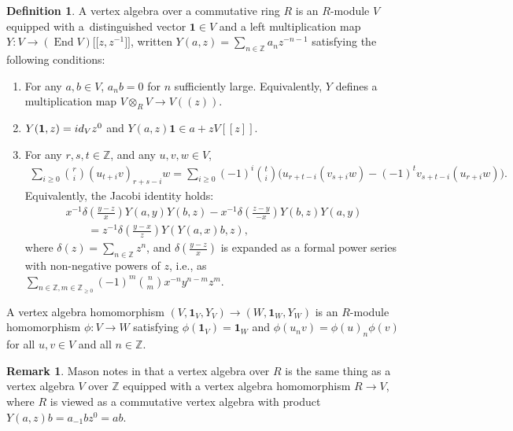 \documentclass[11pt]{article}
\newcommand{\bZ}{\mathbb{Z}}
\newcommand{\unit}{\mathbf{1}}
\DeclareMathOperator{\End}{End}
\theoremstyle{definition}
\newtheorem{defn}[thm]{Definition}
\newtheorem{rem}[thm]{Remark}
\begin{document}
\begin{defn}
A vertex algebra over a commutative ring $R$ is an $R$-module $V$ equipped with a~distinguished vector $\unit \in V$ and a left multiplication map $Y\colon V \to (\End V)\big[\big[z,z^{-1}\big]\big]$, written $Y(a,z) = \sum\limits_{n \in \bZ} a_n z^{-n-1}$ satisfying the following conditions:
\begin{enumerate}\itemsep=0pt
\item For any $a,b \in V$, $a_n b = 0$ for $n$ sufficiently large. Equivalently, $Y$ defines a multiplication map $V \otimes_{R} V \to V((z))$.
\item $Y(\unit,z) = {\rm id}_V z^0$ and $Y(a,z)\unit \in a + zV[[z]]$.
\item For any $r,s,t \in \bZ$, and any $u,v,w \in V$,
\begin{gather*} \sum_{i \geq 0} \binom{r}{i} (u_{t+i} v)_{r+s-i} w = \sum_{i \geq 0} (-1)^i \binom{t}{i} \big(u_{r+t-i}(v_{s+i}w) - (-1)^t v_{s+t-i}(u_{r+i} w)\big).\end{gather*}
Equivalently, the Jacobi identity holds:
 \begin{gather*}
x^{-1} \delta\left(\frac{y-z}{x}\right) Y(a,y) Y(b,z) - x^{-1} \delta\left(\frac{z-y}{-x}\right) Y(b,z) Y(a,y) \\
\qquad{} = z^{-1} \delta\left(\frac{y-x}{z}\right) Y(Y(a,x)b,z),
\end{gather*}
where $\delta(z) = \sum\limits_{n \in \bZ} z^n$, and $\delta\left(\frac{y-z}{x}\right)$ is expanded as a formal power series with non-negative powers of $z$, i.e., as $\sum\limits_{n \in \bZ, m \in \bZ_{\geq 0}} (-1)^m \binom{n}{m} x^{-n}y^{n-m}z^m$.
\end{enumerate}
A vertex algebra homomorphism $(V, \unit_V, Y_V) \to (W, \unit_W, Y_W)$ is an $R$-module homomorphism $\phi\colon V \to W$ satisfying $\phi(\unit_V) = \unit_W$ and $\phi(u_n v) = \phi(u)_n \phi(v)$ for all $u,v \in V$ and all $n \in \bZ$.
\end{defn}

\begin{rem}
Mason notes in \cite{M17} that a vertex algebra over $R$ is the same thing as a vertex algebra $V$ over $\bZ$ equipped with a vertex algebra homomorphism $R \to V$, where $R$ is viewed as a commutative vertex algebra with product $Y(a,z)b = a_{-1}b z^0 = ab$.
\end{rem}
\end{document}
